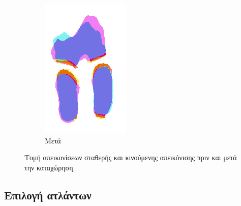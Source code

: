 \documentclass{beamer}
\begin{document}
\begin{frame}
\begin{figure}[H]
\begin{subfigure}[t]{0.24\linewidth}
    \includegraphics[width=\linewidth]{combination_label_after_registration_2.png}
    \caption{Μετά}
    \end{subfigure}

    \caption{Τομή απεικονίσεων σταθερής και κινούμενης απεικόνισης πριν και μετά
             την καταχώρηση.} 
\end{figure}

\end{frame}


\subsection{Επιλογή ατλάντων}
\end{document}
